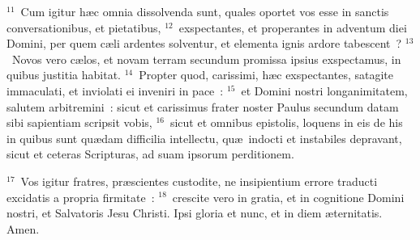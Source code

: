 ${}^{11}$~Cum igitur h\ae c omnia dissolvenda sunt, quales oportet vos esse in sanctis conversationibus, et pietatibus,
${}^{12}$~exspectantes, et properantes in adventum diei Domini, per quem c\ae li ardentes solventur, et elementa ignis ardore tabescent~?
${}^{13}$~Novos vero c\ae los, et novam terram secundum promissa ipsius exspectamus, in quibus justitia habitat.
${}^{14}$~Propter quod, carissimi, h\ae c exspectantes, satagite immaculati, et inviolati ei inveniri in pace~:
${}^{15}$~et Domini nostri longanimitatem, salutem arbitremini~: sicut et carissimus frater noster Paulus secundum datam sibi sapientiam scripsit vobis,
${}^{16}$~sicut et omnibus epistolis, loquens in eis de his in quibus sunt qu\ae dam difficilia intellectu, qu\ae\ indocti et instabiles depravant, sicut et ceteras Scripturas, ad suam ipsorum perditionem.


${}^{17}$~Vos igitur fratres, pr\ae scientes custodite, ne insipientium errore traducti excidatis a propria firmitate~:
${}^{18}$~crescite vero in gratia, et in cognitione Domini nostri, et Salvatoris Jesu Christi. Ipsi gloria et nunc, et in diem \ae ternitatis. Amen.
